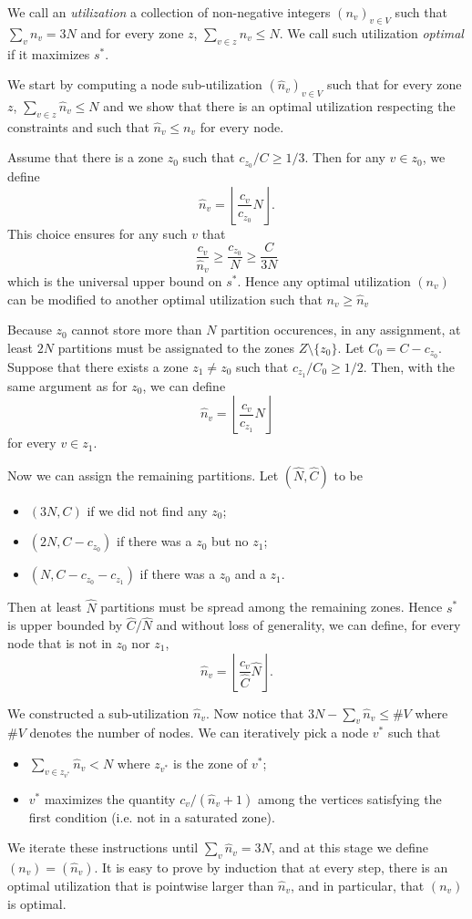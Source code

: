 \documentclass[]{article}
\begin{document}
We call an \emph{utilization} a collection of non-negative integers $(n_v)_{v\in V}$ such that $\sum_v n_v = 3N$ and for every zone $z$, $\sum_{v\in z} n_v \le N$. We call such utilization \emph{optimal} if it maximizes $s^*$.

We start by computing a node sub-utilization $(\hat{n}_v)_{v\in V}$ such that for every zone $z$, $\sum_{v\in z} \hat{n}_v \le N$ and we show that there is an optimal utilization respecting the constraints and such that $\hat{n}_v \le n_v$ for every node.

Assume that there is a zone $z_0$ such that $c_{z_0}/C \ge 1/3$. Then for any $v\in z_0$, we define 
$$\hat{n}_v = \left\lfloor\frac{c_v}{c_{z_0}}N\right\rfloor.$$ 
This choice ensures for any such $v$ that
$$
\frac{c_v}{\hat{n}_v} \ge \frac{c_{z_0}}{N} \ge \frac{C}{3N}
$$
which is the universal upper bound on $s^*$. Hence any optimal utilization $(n_v)$ can be modified to another optimal utilization such that $n_v\ge \hat{n}_v$

Because $z_0$ cannot store more than $N$ partition occurences, in any assignment, at least $2N$ partitions must be assignated to the zones $Z\setminus\{z_0\}$. Let $C_0 = C-c_{z_0}$. Suppose that there exists a zone $z_1\neq z_0$ such that $c_{z_1}/C_0 \ge 1/2$. Then, with the same argument as for $z_0$, we can define 
$$\hat{n}_v = \left\lfloor\frac{c_v}{c_{z_1}}N\right\rfloor$$
for every $v\in z_1$.

Now we can assign the remaining partitions. Let $(\hat{N}, \hat{C})$ to be
\begin{itemize}
	\item $(3N,C)$ if we did not find any $z_0$;
	\item $(2N,C-c_{z_0})$ if there was a $z_0$ but no $z_1$;
	\item $(N,C-c_{z_0}-c_{z_1})$ if there was a $z_0$ and a $z_1$.
\end{itemize}
Then at least $\hat{N}$ partitions must be spread among the remaining zones. Hence $s^*$ is upper bounded by $\hat{C}/\hat{N}$ and without loss of generality, we can define, for every node that is not in $z_0$ nor $z_1$, 
$$\hat{n}_v = \left\lfloor\frac{c_v}{\hat{C}}\hat{N}\right\rfloor.$$ 

We constructed a sub-utilization $\hat{n}_v$. Now notice that $3N-\sum_v \hat{n}_v \le \# V$ where $\# V$ denotes the number of nodes. We can iteratively pick a node $v^*$ such that 
\begin{itemize}
	\item $\sum_{v\in z_{v^*}} \hat{n}_v < N$ where $z_{v^*}$ is the zone of $v^*$;
	\item $v^*$ maximizes the quantity $c_v/(\hat{n}_v+1)$ among the vertices satisfying the first condition (i.e. not in a saturated zone).
\end{itemize}
We iterate these instructions until $\sum_v \hat{n}_v= 3N$, and at this stage we define $(n_v) = (\hat{n}_v)$. It is easy to prove by induction that at every step, there is an optimal utilization that is pointwise larger than $\hat{n}_v$, and in particular, that $(n_v)$ is optimal.
\end{document}
